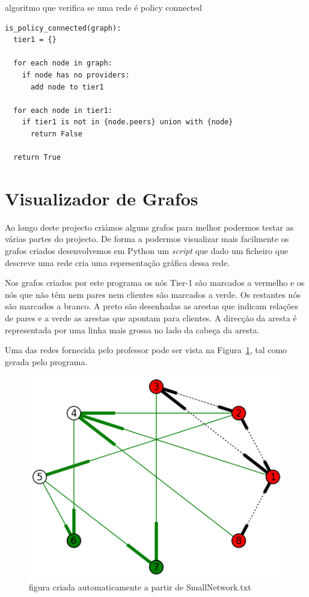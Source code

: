 \documentclass[10pt,a4paper]{article}
\begin{document}
\begin{algorithm}
\caption{algoritmo que verifica se uma rede é policy connected}
\label{algo:testpolicy}
\begin{lstlisting}
is_policy_connected(graph):
  tier1 = {}

  for each node in graph:
    if node has no providers:
      add node to tier1

  for each node in tier1:
    if tier1 is not in {node.peers} union with {node}
      return False

  return True
\end{lstlisting}
\end{algorithm}


\section{Visualizador de Grafos}
Ao longo deste projecto criámos alguns grafos para melhor podermos testar as várias partes do projecto. De forma a podermos visualizar mais facilmente os grafos criados desenvolvemos em Python um \textit{script} que dado um ficheiro que descreve uma rede cria uma representação gráfica dessa rede.

Nos grafos criados por este programa os nós Tier-1 são marcados a vermelho e os nós que não têm nem pares nem clientes são marcados a verde. Os restantes nós são marcados a branco. A preto são desenhadas as arestas que indicam relações de pares e a verde as arestas que apontam para clientes. A direcção da aresta é representada por uma linha mais grossa no lado da cabeça da aresta.

Uma das redes fornecida pelo professor pode ser vista na Figura~\ref{fig:SmallNetwork}, tal como gerada pelo programa.

\begin{figure}[h]
\centering
\includegraphics[scale=0.6]{SmallNetwork}
\caption{figura criada automaticamente a partir de SmallNetwork.txt}
\label{fig:SmallNetwork}
\end{figure}
\end{document}
